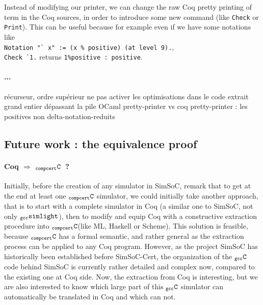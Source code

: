 \documentclass[a4paper, 11pt]{article}
\newcommand{\gccSL}{$_{\tt gcc}{\tt simlight}$\xspace}
\newcommand{\CCasm}{$_{\tt compcert}{\tt ASM}$\xspace}
\newcommand{\C}{$_{\tt compcert}{\tt C}$\xspace}
\newcommand{\gccC}{$_{\tt gcc}{\tt C}$\xspace}
\newcommand{\simsoc}{SimSoC\xspace}
\newcommand{\SScert}{SimSoC-Cert\xspace}
\begin{document}
Instead of modifying our printer, we can change the raw Coq pretty printing of term in the Coq sources, in order to introduce some new command (like \verb|Check| or \verb|Print|). This can be useful because for example even if we have some notations like \\
\verb|Notation "` x" := (x % positive) (at level 9).|, \\
\verb|Check `1.| returns \verb|1%positive : positive|.



\paragraph{...}
récurseur, ordre supérieur
ne pas activer les optimisations dans le code extrait
grand entier dépassant la pile OCaml
pretty-printer vs coq pretty-printer : les positives non delta-notation-reduits

\subsection{Future work : the equivalence proof}
\paragraph{Coq $\Longrightarrow$ \C~?}
Initially, before the creation of any simulator in \simsoc, remark that to get at the end at least one \C simulator, we could initially take another approach, that is to start with a complete simulator in Coq (a similar one to \simsoc, not only \gccSL), then to modify and equip Coq with a constructive extraction procedure into \C (like ML, Haskell or Scheme). This solution is feasible, because \C has a formal semantic, and rather general as the extraction process can be applied to any Coq program. However, as the project \simsoc has historically been established before \SScert, the organization of the \gccC code behind \simsoc is currently rather detailed and complex now, compared to the existing one at Coq side. Now, the extraction from Coq is interesting, but we are also interested to know which large part of this \gccC simulator can automatically be translated in Coq and which can not.
\end{document}
